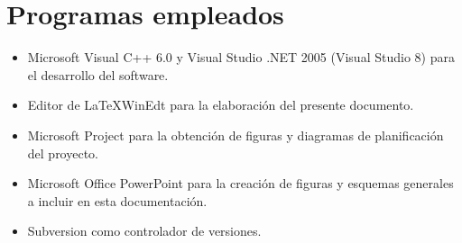 \chapter*{Programas empleados}

\begin{itemize}
  \item Microsoft Visual C++ 6.0 y  Visual Studio .NET 2005 (Visual Studio 8) para el desarrollo del software.
  \item Editor de \LaTeX WinEdt para la elaboraci\'{o}n del presente documento.
  \item Microsoft Project para la obtenci\'{o}n de figuras y diagramas de planificaci\'{o}n del proyecto.
  \item Microsoft Office PowerPoint para la creaci\'{o}n de figuras y esquemas generales a incluir en esta documentaci\'{o}n.
  \item Subversion como controlador de versiones.
\end{itemize}
